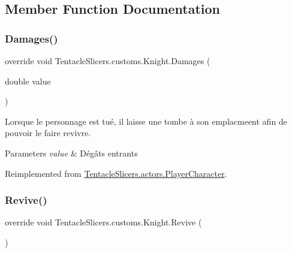 \subsection{Member Function Documentation}
\mbox{\label{class_tentacle_slicers_1_1customs_1_1_knight_aa910b96f987e5aba0fb93b2aeabe6261}} 
\subsubsection{\texorpdfstring{Damages()}{Damages()}}
{\footnotesize\ttfamily override void Tentacle\+Slicers.\+customs.\+Knight.\+Damages (\begin{DoxyParamCaption}\item[{double}]{value }\end{DoxyParamCaption})\hspace{0.3cm}{\ttfamily [virtual]}}



Lorsque le personnage est tué, il laisse une tombe à son emplacmeent afin de pouvoir le faire revivre. 


\begin{DoxyParams}{Parameters}
{\em value} & Dégâts entrants \\
\hline
\end{DoxyParams}


Reimplemented from \hyperlink{class_tentacle_slicers_1_1actors_1_1_player_character_a40d9846096c2aaddb7112631310b240b}{Tentacle\+Slicers.\+actors.\+Player\+Character}.

\mbox{\label{class_tentacle_slicers_1_1customs_1_1_knight_a32666ab0b1401a669d4c32237c310c3e}} 
\subsubsection{\texorpdfstring{Revive()}{Revive()}}
{\footnotesize\ttfamily override void Tentacle\+Slicers.\+customs.\+Knight.\+Revive (\begin{DoxyParamCaption}{ }\end{DoxyParamCaption})\hspace{0.3cm}{\ttfamily [virtual]}}




